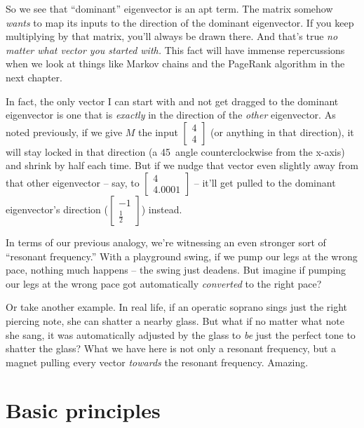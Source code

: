 So we see that ``dominant'' eigenvector is an apt term. The matrix somehow
\textit{wants} to map its inputs to the direction of the dominant eigenvector.
If you keep multiplying by that matrix, you'll always be drawn there. And
that's true \textit{no matter what vector you started with.} This fact will
have immense repercussions when we look at things like Markov chains and the
PageRank algorithm in the next chapter.

In fact, the only vector I can start with and not get dragged to the dominant
eigenvector is one that is \textit{exactly} in the direction of the
\textit{other} eigenvector. As noted previously, if we give $M$ the input
{\footnotesize $\begin{bmatrix} 4 \\ 4 \end{bmatrix}$} (or anything in that
direction), it will stay locked in that direction (a 45\textdegree~angle
counterclockwise from the x-axis) and shrink by half each time. But if we nudge
that vector even slightly away from that other eigenvector -- say, to
{\scriptsize $\begin{bmatrix} 4 \\ 4.0001 \end{bmatrix}$} -- it'll get pulled
to the dominant eigenvector's direction ({\scriptsize $\begin{bmatrix} -1 \\
\frac{1}{2} \end{bmatrix}$}) instead.

\bigskip

In terms of our previous analogy, we're witnessing an even stronger sort of
``resonant frequency.'' With a playground swing, if we pump our legs at the
wrong pace, nothing much happens -- the swing just deadens. But imagine if
pumping our legs at the wrong pace got automatically \textit{converted} to the
right pace?

Or take another example. In real life, if an operatic soprano sings just the
right piercing note, she can shatter a nearby glass. But what if no matter what
note she sang, it was automatically adjusted by the glass to \textit{be} just
the perfect tone to shatter the glass? What we have here is not only a resonant
frequency, but a magnet pulling every vector \textit{towards} the resonant
frequency. Amazing.

\section{Basic principles}


